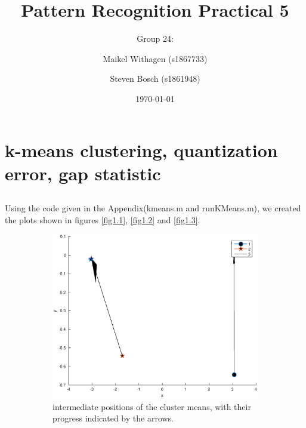 \documentclass[10pt]{article}
\title{Pattern Recognition Practical 5}
\author{Group 24: \and Maikel Withagen (s1867733) \and Steven Bosch (s1861948)}
\date{\today}
\begin{document}
\maketitle

\section{k-means clustering, quantization error, gap statistic}
\subsection{}
Using the code given in the Appendix(kmeans.m and runKMeans.m), 
we created the plots shown in figures \ref{fig1.1}, \ref{fig1.2} and \ref{fig1.3}.\\

\begin{figure}[H]
  \centering
  \caption{Results for k=2}
  \begin{subfigure}[b]{.45\textwidth}
    \includegraphics[width=\columnwidth]{Fig1_k2.eps}
    \caption{intermediate positions of the cluster means, 
    with their progress indicated by the arrows.}
    \label{fig1a}
  \end{subfigure}
  \quad
  \begin{subfigure}[b]{.45\textwidth}

\end{subfigure}
\end{figure}
\end{document}

